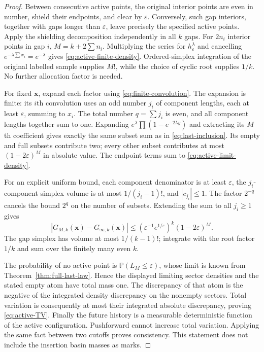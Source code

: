 \documentclass[11pt,letterpaper]{article}
\newcommand{\PP}{\mathbb P}\newcommand{\EE}{\mathbb E}
\begin{document}
\begin{proof}
Between consecutive active points, the original interior points are even
in number, shield their endpoints, and clear by $\varepsilon$. Conversely,
such gap interiors, together with gaps longer than $\varepsilon$, leave
precisely the specified active points. Apply the shielding decomposition
independently in all $k$ gaps. For $2n_i$ interior points in gap $i$,
$M=k+2\sum n_i$. Multiplying the series for $h_\varepsilon^\lambda$
and cancelling $e^{-\lambda\sum x_i}=e^{-\lambda}$ gives
\eqref{eq:active-finite-density}. Ordered-simplex integration of the
original labelled sample supplies $M!$, while the choice of cyclic root
supplies $1/k$. No further allocation factor is needed.

For fixed $\mathbf x$, expand each factor using
\eqref{eq:finite-convolution}. The expansion is finite: its $i$th
convolution uses an odd number $j_i$ of component lengths, each at least
$\varepsilon$, summing to $x_i$. The total number $q=\sum j_i$ is even,
and all component lengths together sum to one. Expanding
$e^\lambda\prod(1-e^{-2\lambda y})$ and extracting its $M$th coefficient
gives exactly the same subset sum as in \eqref{eq:last-inclusion}.
Its empty and full subsets contribute two; every other subset contributes
at most $(1-2\varepsilon)^M$ in absolute value. The endpoint terms sum
to \eqref{eq:active-limit-density}.

For an explicit uniform bound, each component denominator is at least
$\varepsilon$, the $j_i$-component simplex volume is at most
$1/(j_i-1)!$, and $|c_{j_i}|\le1$. The factor $2^{-q}$ cancels the bound
$2^q$ on the number of subsets. Extending the sum to all $j_i\ge1$ gives
\[
 |G_{M,k}(\mathbf x)-G_{\infty,k}(\mathbf x)|
 \le(\varepsilon^{-1}e^{1/\varepsilon})^k(1-2\varepsilon)^M.
\]
The gap simplex has volume at most $1/(k-1)!$; integrate with the root
factor $1/k$ and sum over the finitely many even $k$.

The probability of no active point is $\PP(L_M\le\varepsilon)$, whose
limit is known from Theorem~\ref{thm:full-last-law}. Hence the displayed
limiting sector densities and the stated empty atom have total mass one.
The discrepancy of that atom is the negative of the integrated density
discrepancy on the nonempty sectors. Total variation is consequently at
most their integrated absolute discrepancy, proving
\eqref{eq:active-TV}. Finally the future history is a measurable
deterministic function of the active configuration. Pushforward cannot
increase total variation. Applying the same fact between two cutoffs
proves consistency. This statement does not include the insertion basin
masses as marks.
\end{proof}
\end{document}
